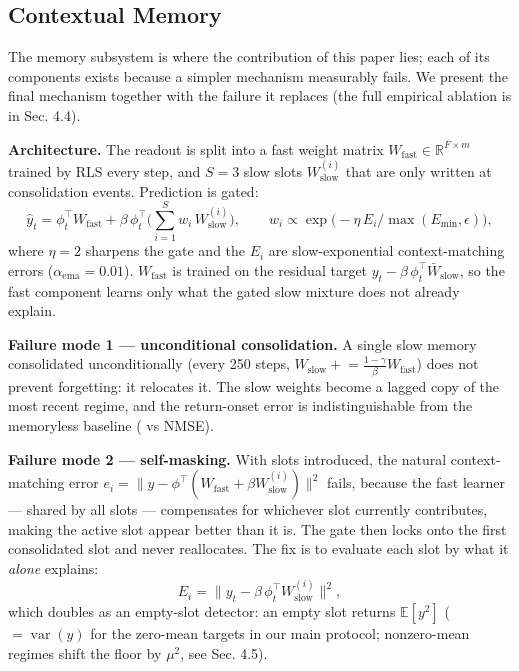 \documentclass[11pt]{article}
\begin{document}
\subsection{Contextual Memory}\label{contextual-memory}

The memory subsystem is where the contribution of this paper lies; each
of its components exists because a simpler mechanism measurably fails.
We present the final mechanism together with the failure it replaces
(the full empirical ablation is in Sec. 4.4).

\textbf{Architecture.} The readout is split into a fast weight matrix
\(W_{\mathrm{fast}} \in \mathbb{R}^{F\times m}\) trained by RLS every step,
and \(S=3\) slow slots \(W_{\mathrm{slow}}^{(i)}\) that are only written at
consolidation events. Prediction is gated:
\[
\hat{y}_t = \phi_t^{\top}W_{\mathrm{fast}} + \beta\,\phi_t^{\top}\!\Big(\sum_{i=1}^{S} w_i\, W_{\mathrm{slow}}^{(i)}\Big),\qquad
w_i \propto \exp\!\big(-\eta\, E_i / \max(E_{\min},\epsilon)\big),
\]
where \(\eta=2\) sharpens the gate and the \(E_i\) are slow-exponential
context-matching errors (\(\alpha_{\mathrm{ema}}=0.01\)). \(W_{\mathrm{fast}}\)
is trained on the residual target \(y_t - \beta\,\phi_t^\top
\bar{W}_{\mathrm{slow}}\), so the fast component learns only what the
gated slow mixture does not already explain.

\textbf{Failure mode 1 --- unconditional consolidation.} A single slow memory
consolidated unconditionally (every 250 steps,
\(W_{\mathrm{slow}} \mathrel{+}= \tfrac{1-\gamma}{\beta}W_{\mathrm{fast}}\))
does not prevent forgetting: it relocates it. The slow weights become a
lagged copy of the most recent regime, and the return-onset error is
indistinguishable from the memoryless baseline (\naiveOnset{} vs \blockOnset{} NMSE).

\textbf{Failure mode 2 --- self-masking.} With slots introduced, the natural
context-matching error \(e_i = \|y - \phi^\top(W_{\mathrm{fast}} +
\beta W_{\mathrm{slow}}^{(i)})\|^2\) fails, because the fast learner ---
shared by all slots --- compensates for whichever slot currently
contributes, making the active slot appear better than it is. The gate
then locks onto the first consolidated slot and never reallocates. The
fix is to evaluate each slot by what it \emph{alone} explains:
\[
E_i = \|y_t - \beta\,\phi_t^\top W_{\mathrm{slow}}^{(i)}\|^2,
\]
which doubles as an empty-slot detector: an empty slot returns
\(\mathbb{E}[y^{2}]\) (\(=\operatorname{var}(y)\) for the zero-mean targets
in our main protocol; nonzero-mean regimes shift the floor by
\(\mu^{2}\), see Sec. 4.5).
\end{document}
